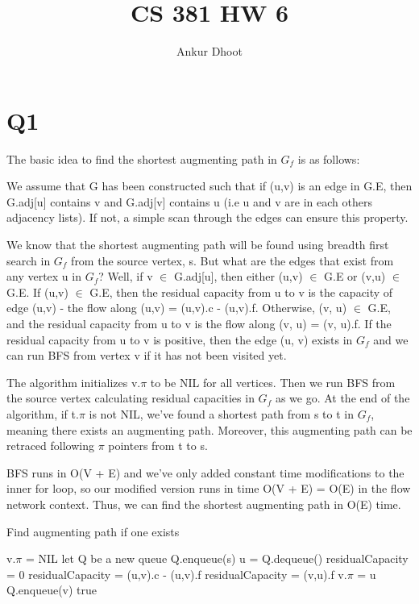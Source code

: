 \documentclass[11pt,a4paper]{article}
\begin{document}
\author{Ankur Dhoot}
\title{CS 381 HW 6}
\maketitle

\section*{Q1}
The basic idea to find the shortest augmenting path in $G_{f}$ is as follows:

We assume that G has been constructed such that if (u,v) is an edge in G.E, then G.adj[u] contains v and G.adj[v] contains u (i.e u and v are in each others adjacency lists). If not, a simple scan through the edges can ensure this property. 

We know that the shortest augmenting path will be found using breadth first search in $G_{f}$ from the source vertex, s. But what are the edges that exist from any vertex u in $G_{f}$? Well, if v $\in$ G.adj[u], then either (u,v) $\in$ G.E or (v,u) $\in$ G.E. If (u,v) $\in$ G.E, then the residual capacity from u to v is the capacity of edge (u,v) - the flow along (u,v) = (u,v).c - (u,v).f. Otherwise, (v, u) $\in$ G.E, and the residual capacity from u to v is the flow along (v, u) = (v, u).f. If the residual capacity from u to v is positive, then the edge (u, v) exists in $G_{f}$ and we can run BFS from vertex v if it has not been visited yet.

The algorithm initializes v.$\pi$ to be NIL for all vertices. Then we run BFS from the source vertex calculating residual capacities in $G_{f}$ as we go. At the end of the algorithm, if t.$\pi$ is not NIL, we've found a shortest path from s to t in $G_{f}$, meaning there exists an augmenting path. Moreover, this augmenting path can be retraced following $\pi$ pointers from t to s.

BFS runs in O(V + E) and we've only added constant time modifications to the inner for loop, so our modified version runs in time O(V + E) = O(E) in the flow network context. Thus, we can find the shortest augmenting path in O(E) time.
\begin{algorithm}
\caption{Find augmenting path if one exists}
\begin{algorithmic}[1]
		\State v.$\pi$ = NIL
	\EndFor
	\State let Q be a new queue
	\State Q.enqueue(s)
		\State u = Q.dequeue()
			\State residualCapacity = 0
				\State residualCapacity = (u,v).c - (u,v).f
			\Else 
				\State residualCapacity = (v,u).f
			\EndIf
				\State v.$\pi$ = u
				\State Q.enqueue(v)
			\EndIf
		\EndFor
	\EndWhile
		\State \Return true
	\EndIf
	

\EndFunction
\end{algorithmic}
\end{algorithm}
\end{document}
